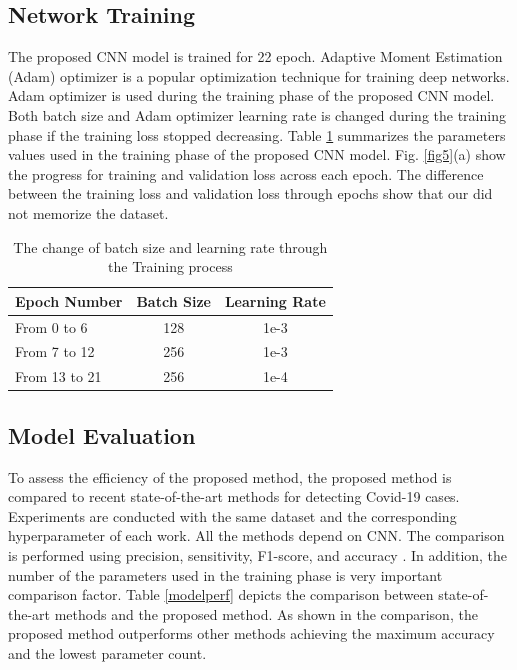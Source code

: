 \subsection{Network Training}
The proposed CNN model  is trained for 22 epoch. Adaptive Moment Estimation (Adam) optimizer \cite{kingma2014adam} is a popular optimization  technique for training deep networks. Adam optimizer is used  during the training  phase of the proposed CNN model. Both batch size and Adam optimizer learning rate is changed during the training phase if the training loss stopped decreasing. Table \ref{tabTrparam} summarizes the  parameters values used in the training phase of the proposed CNN model.  Fig. \ref{fig5}(a) show the progress for training and validation loss across each epoch. The difference between the training loss and validation loss through epochs show that our did not memorize the dataset.
\begin{table}[htbp]
\caption{The change of batch size and learning rate through the Training process}
\begin{center}

\begin{tabular}{|l|c|c|}
\hline
\textbf{Epoch Number} & \textbf{Batch Size} & \textbf{Learning Rate} \\
\hline
\hline
From 0 to 6 & 128 & 1e-3\\
\hline
From 7 to 12 & 256 & 1e-3\\
\hline
From 13 to 21 & 256 & 1e-4\\
\hline
 
\end{tabular}
\label{tabTrparam}
\end{center}
\end{table}



\subsection{Model Evaluation}

To assess the efficiency of the proposed method,  the proposed method is compared to recent state-of-the-art methods for detecting Covid-19 cases. Experiments are conducted with the same dataset and the corresponding hyperparameter of each work. All the methods depend on CNN. The comparison is performed using precision, sensitivity, F1-score, and accuracy \cite{hossin2015review}. In addition, the number of the parameters used in the training phase is  very important comparison factor. Table \ref{modelperf} depicts the comparison between state-of-the-art methods and the proposed method. As shown in the comparison, the proposed method  outperforms other methods achieving the maximum accuracy and the lowest  parameter count. 



